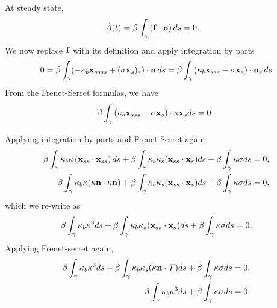 \documentclass[aps,prl,showpacs]{revtex4}
\begin{document}
At steady state,
\begin{align}
    \dot{A}(t) &= \beta \int_{\gamma}\left(\mathbf{f}\cdot\mathbf{n}\right)ds =0.
\end{align}
We now replace $\mathbf{f}$ with its definition and apply integration by parts
\begin{align}
   0=\beta\int_{\gamma} 
    (-\kappa_b\mathbf{x}_{ssss}+(\sigma\mathbf{x}_s)_s)\cdot\mathbf{n}\, ds =
   \beta\int_{\gamma}\left(\kappa_b\mathbf{x}_{sss}-\sigma\mathbf{x}_s\right)\cdot
     \mathbf{n}_s\, ds
\end{align}
From the Frenet-Serret formulas, we have 
\begin{align}
     -\beta\int_{\gamma}
     \left(\kappa_b\mathbf{x}_{sss}-\sigma\mathbf{x}_s\right)\cdot\kappa\mathbf{x}_s ds &=0.
\end{align}

Applying integration by parts and Frenet-Serret again
\begin{align}
     \beta\int_{\gamma}
     \kappa_b\kappa\left(\mathbf{x}_{ss}\cdot\mathbf{x}_{ss}\right)ds + \beta
     \int_{\gamma} \kappa_b \kappa_s(\mathbf{x}_{ss} \cdot \mathbf{x}_s)ds +\beta\int_{\gamma}\kappa\sigma ds  &= 0,\\
    \beta\int_{\gamma} \kappa_b\kappa(\kappa\mathbf{n} \cdot
     \kappa\mathbf{n})+ \beta \int_{\gamma} \kappa_b \kappa_s(\mathbf{x}_{ss} \cdot
     \mathbf{x}_s)ds +\beta\int_{\gamma}\kappa\sigma ds &= 0,
\end{align}
which we re-write as
\begin{align}
   \beta\int_{\gamma}\kappa_b\kappa^3 ds + \beta \int_{\gamma} \kappa_b
   \kappa_s(\mathbf{x}_{ss} \cdot \mathbf{x}_s)ds +\beta\int_{\gamma} \kappa\sigma ds = 0.
\end{align}
Applying Frenet-serret again,
\begin{align}
    \beta\int_{\gamma}\kappa_b\kappa^3 ds + \beta \int_{\gamma} \kappa_b
    \kappa_s(\kappa\mathbf{n} \cdot \mathcal{T})ds +\beta\int_{\gamma} \kappa\sigma ds = 0, \\
    \beta\int_{\gamma}\kappa_b\kappa^3 ds +\beta\int_{\gamma} \kappa\sigma ds  = 0.
\end{align}
\end{document}
